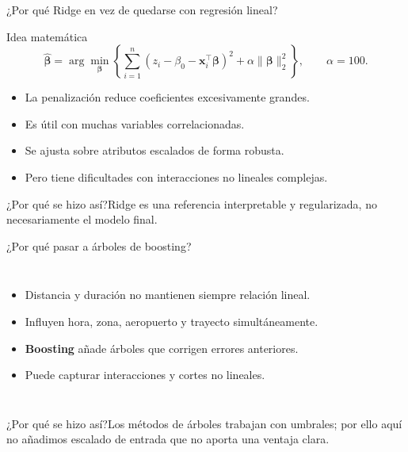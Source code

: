 \documentclass[aspectratio=169,11pt]{beamer}
\newcommand{\porq}[1]{\vspace{1.2mm}\begin{block}{¿Por qué se hizo así?}\small #1\end{block}}
\begin{document}
\begin{frame}{¿Por qué Ridge en vez de quedarse con regresión lineal?}
\begin{block}{Idea matemática}
\[
\widehat{\boldsymbol\beta}
 =\arg\min_{\boldsymbol\beta}\left\{\sum_{i=1}^n(z_i-\beta_0-\mathbf x_i^\top\boldsymbol\beta)^2
 +\alpha\lVert\boldsymbol\beta\rVert_2^2\right\},\qquad \alpha=100.
\]
\end{block}
\begin{itemize}
\item La penalización reduce coeficientes excesivamente grandes.
\item Es útil con muchas variables correlacionadas.
\item Se ajusta sobre atributos escalados de forma robusta.
\item Pero tiene dificultades con interacciones no lineales complejas.
\end{itemize}
\porq{Ridge es una referencia interpretable y regularizada, no necesariamente el modelo final.}
\end{frame}

\begin{frame}{¿Por qué pasar a árboles de boosting?}
\begin{columns}[T]
\begin{itemize}
\item Distancia y duración no mantienen siempre relación lineal.
\item Influyen hora, zona, aeropuerto y trayecto simultáneamente.
\item \textbf{Boosting} añade árboles que corrigen errores anteriores.
\item Puede capturar interacciones y cortes no lineales.
\end{itemize}
\centering
{}
\end{columns}
\porq{Los métodos de árboles trabajan con umbrales; por ello aquí no añadimos escalado de entrada que no aporta una ventaja clara.}
\end{frame}
\end{document}
